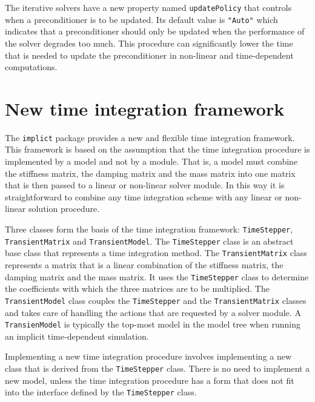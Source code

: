 \documentclass[a4paper]{article}
\newcommand{\Code}[1]{\texttt{#1}}
\begin{document}
The iterative solvers have a new property named \Code{updatePolicy} that
controls when a preconditioner is to be updated. Its default value is
\Code{"Auto"} which indicates that a preconditioner should only be
updated when the performance of the solver degrades too much. This
procedure can significantly lower the time that is needed to update the
preconditioner in non-linear and time-dependent computations.


\section{New time integration framework}

The \Code{implict} package provides a new and flexible time integration
framework. This framework is based on the assumption that the time
integration procedure is implemented by a model and not by a module. That
is, a model must combine the stiffness matrix, the damping matrix and the
mass matrix into one matrix that is then passed to a linear or non-linear
solver module. In this way it is straightforward to combine any time
integration scheme with any linear or non-linear solution procedure.

Three classes form the basis of the time integration framework:
\Code{TimeStepper}, \Code{TransientMatrix} and \Code{TransientModel}. The
\Code{TimeStepper} class is an abstract base class that represents a time
integration method. The \Code{TransientMatrix} class represents a matrix
that is a linear combination of the stiffness matrix, the damping matrix
and the mass matrix. It uses the \Code{TimeStepper} class to determine
the coefficients with which the three matrices are to be multiplied. The
\Code{TransientModel} class couples the \Code{TimeStepper} and the
\Code{TransientMatrix} classes and takes care of handling the actions
that are requested by a solver module. A \Code{TransienModel} is
typically the top-most model in the model tree when running an implicit
time-dependent simulation.

Implementing a new time integration procedure involves implementing a new
class that is derived from the \Code{TimeStepper} class. There is no need
to implement a new model, unless the time integration procedure has a
form that does not fit into the interface defined by the
\Code{TimeStepper} class.

\end{document}
